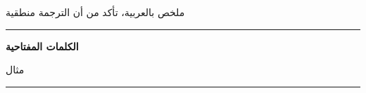 \chapter*{}

\begin{RLtext}

 \noindent ملخص بالعربية، تأكد من أن الترجمة منطقية


\end{RLtext}

\noindent\rule[2pt]{\textwidth}{0.5pt}

\begin{RLtext} 

{\textbf{الكلمات المفتاحية}}

مثال
\\

\end{RLtext}

\noindent\rule[2pt]{\textwidth}{0.5pt}